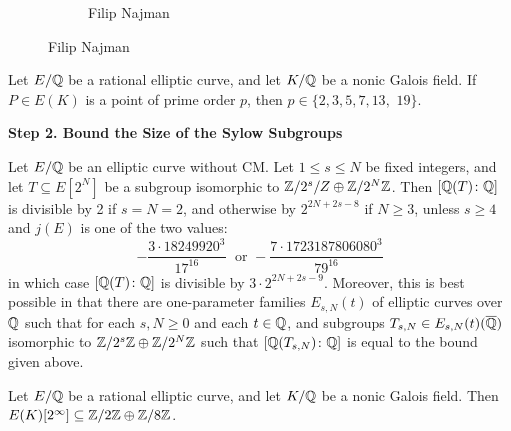 \begin{frame}[plain]
\begin{figure}[h]
\begin{subfigure}{0.3\textwidth}
	\caption{Filip Najman}
	\end{subfigure}
	\end{figure}
\end{frame}



\begin{frame}[plain]
\begin{prop}
Let $E/\mathbb{Q}$ be a rational elliptic curve, and let $K/\mathbb{Q}$ be a nonic Galois field. If $P \in E(K)$ is a point of prime order $p$, then $p \in \{ 2, 3, 5, 7, 13,$ $19 \}$.
\end{prop}
\end{frame}



\begin{frame}[plain]
\vfill
\begin{center} {\bfseries \Large \textcolor{SwarthGarnet}{Step 2. Bound the Size of the Sylow Subgroups}} \end{center}
\vfill 
\end{frame}



\begin{frame}[plain]
\begin{thm}
Let $E/\mathbb{Q}$ be an elliptic curve without CM. Let $1 \leq s \leq N$ be fixed integers, and let $T \subseteq E[2^N]$ be a subgroup isomorphic to $\mathbb{Z}/2^s/Z \oplus \mathbb{Z}/2^N \mathbb{Z}$. Then $[\mathbb{Q}(T) \colon \mathbb{Q}]$ is divisible by 2 if $s=N=2$, and otherwise by $2^{2N+2s-8}$ if $N \geq 3$, unless $s \geq 4$ and $j(E)$ is one of the two values:
	\[
	- \dfrac{3 \cdot 18249920^3}{17^{16}}\; \text{ or } - \dfrac{7 \cdot 1723187806080^3}{79^{16}}
	\]
in which case $[\mathbb{Q}(T) \colon \mathbb{Q}]$ is divisible by $3 \cdot 2^{2N+2s-9}$. Moreover, this is best possible in that there are one-parameter families $E_{s,N}(t)$ of elliptic curves over $\mathbb{Q}$ such that for each $s, N \geq 0$ and each $t \in \mathbb{Q}$, and subgroups $T_{s,N} \in E_{s,N}(t)(\overline{\mathbb{Q}})$ isomorphic to $\mathbb{Z}/2^s\mathbb{Z} \oplus \mathbb{Z}/2^N\mathbb{Z}$ such that $[\mathbb{Q}(T_{s,N}) \colon \mathbb{Q}]$ is equal to the bound given above. 
\end{thm}
\end{frame}



\begin{frame}[plain]
\begin{lem}
Let $E/\mathbb{Q}$ be a rational elliptic curve, and let $K/\mathbb{Q}$ be a nonic Galois field. Then $E(K)[2^\infty] \subseteq \mathbb{Z}/2\mathbb{Z} \oplus \mathbb{Z}/8\mathbb{Z}$.
\end{lem}
\end{frame}



